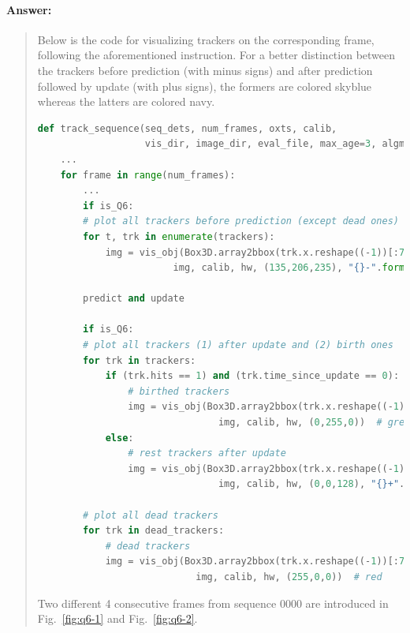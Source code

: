 \documentclass[11pt]{article}
\begin{document}
\paragraph{Answer:} 
\begin{quote}

Below is the code for visualizing trackers on the corresponding frame, following the aforementioned instruction. For a better distinction between the trackers before prediction (with minus signs) and after prediction followed by update (with plus signs), the formers are colored skyblue whereas the latters are colored navy.

\begin{lstlisting}[language=Python, basicstyle=\scriptsize]
def track_sequence(seq_dets, num_frames, oxts, calib, 
                   vis_dir, image_dir, eval_file, max_age=3, algm="greedy"):
    ...
    for frame in range(num_frames):
        ...
        if is_Q6:
        # plot all trackers before prediction (except dead ones)
        for t, trk in enumerate(trackers):
            img = vis_obj(Box3D.array2bbox(trk.x.reshape((-1))[:7]), 
                        img, calib, hw, (135,206,235), "{}-".format(trk.ID))  # skyblue
        
        predict and update
        
        if is_Q6:
        # plot all trackers (1) after update and (2) birth ones
        for trk in trackers:
            if (trk.hits == 1) and (trk.time_since_update == 0):
                # birthed trackers
                img = vis_obj(Box3D.array2bbox(trk.x.reshape((-1))[:7]), 
                                img, calib, hw, (0,255,0))  # green
            else:
                # rest trackers after update
                img = vis_obj(Box3D.array2bbox(trk.x.reshape((-1))[:7]), 
                                img, calib, hw, (0,0,128), "{}+".format(trk.ID))  # navy

        # plot all dead trackers
        for trk in dead_trackers:
            # dead trackers
            img = vis_obj(Box3D.array2bbox(trk.x.reshape((-1))[:7]), 
                            img, calib, hw, (255,0,0))  # red
\end{lstlisting}

Two different 4 consecutive frames from sequence 0000 are introduced in Fig.~\ref{fig:q6-1} and Fig.~\ref{fig:q6-2}. 


\end{quote}
\end{document}
